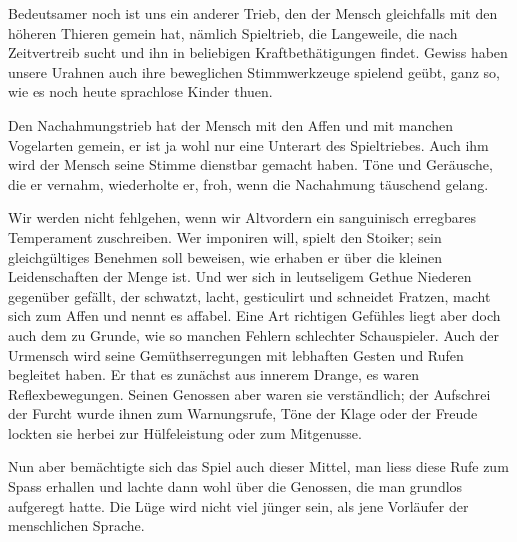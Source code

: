 

\largerpage[1]


Bedeutsamer noch ist uns ein anderer Trieb, den der Mensch gleichfalls mit den höheren Thieren gemein hat, nämlich  Spieltrieb, die Langeweile, die nach Zeitvertreib sucht und ihn in beliebigen Kraftbethätigungen findet. Gewiss haben unsere Urahnen auch ihre beweglichen Stimmwerkzeuge spielend geübt, ganz so, wie es noch heute sprachlose Kinder thuen.

\label{fp.299}

Den Nachahmungstrieb hat der Mensch mit den Affen und mit manchen Vogelarten gemein, er ist ja wohl nur eine Unterart des Spieltriebes. Auch ihm wird der Mensch seine Stimme dienstbar gemacht haben. Töne und Geräusche, die er vernahm, wiederholte er, froh, wenn die Nachahmung täuschend gelang.

Wir werden nicht fehlgehen, wenn wir  Altvordern ein sanguinisch \label{sp.309} erregbares Temperament zuschreiben. Wer imponiren will, spielt den Stoiker; sein gleichgültiges Benehmen soll beweisen, wie erhaben er über die kleinen Leidenschaften der Menge ist. Und wer sich in leutseligem Gethue Niederen gegenüber gefällt, der schwatzt, lacht, gesticulirt und schneidet Fratzen, macht sich zum Affen und nennt es affabel. Eine Art richtigen Gefühles liegt aber doch auch dem zu Grunde, wie so manchen Fehlern schlechter Schauspieler. Auch der Urmensch wird seine Gemüthserregungen mit lebhaften Gesten und Rufen begleitet haben. Er that es zunächst aus innerem Drange, es waren Reflexbewegungen. Seinen Genossen aber waren sie verständlich; der Aufschrei der Furcht wurde ihnen zum Warnungsrufe, Töne der Klage oder der Freude lockten sie herbei zur Hülfeleistung oder zum Mitgenusse.

Nun aber bemächtigte sich das Spiel auch dieser Mittel, man liess diese Rufe zum Spass erhallen und lachte dann wohl über die Genossen, die man grundlos aufgeregt hatte. Die Lüge wird nicht viel jünger sein, als jene Vorläufer der menschlichen Sprache.

